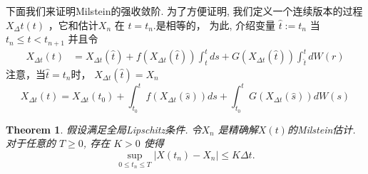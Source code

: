 \documentclass[12pt,final]{article}
\numberwithin{equation}{section}
\numberwithin{figure}{section}
\numberwithin{table}{section}
\theoremstyle{plain}
\newtheorem{Theorem}{Theorem}[section]   %
\theoremstyle{Definition}
\theoremstyle{Remark}
\begin{document}
	
	下面我们来证明Milstein的强收敛阶. 为了方便证明, 我们定义一个连续版本的过程 $X_\Delta t(t)$ ，它和估计$X_n$ 在 $t=t_n.$是相等的， 为此, 介绍变量 $\hat{t}:=t_n$ 当$t_n\leq t<t_{n+1}$ 并且令
	$$\begin{aligned}
		X_{\Delta t}(t)&=X_{\Delta t}(\hat{t})+f(X_{\Delta t}(\hat{t}))\int_{\hat{t}}^{t}ds+G(X_{\Delta t}(\hat{t}))\int_{\hat{t}}^{t}dW(r)
	\end{aligned}$$
	注意，当$\hat{t}=t_n$时，	$X_{\Delta t}(\hat{t})=X_n$
	\begin{equation}\label{Milnum}
		X_{\Delta t}(t)=X_{\Delta t}(t_{0})+\int_{t_{0}}^{t}f(X_{\Delta t}(\hat{s}))ds+\int_{t_{0}}^{t}G(X_{\Delta t}(\hat{s}))dW(s)
	\end{equation}
	
	\begin{Theorem}
		假设满足全局Lipschitz条件.
		令$X_n$ 是精确解$X(t)$的Milstein估计. 对于任意的 $T\geq 0$, 存在 $K> 0$ 使得
		$$\sup\limits_{0\leq t_n\leq T}\left|X(t_n)-X_n\right|\leq K\Delta t.$$
	\end{Theorem}
\end{document}
